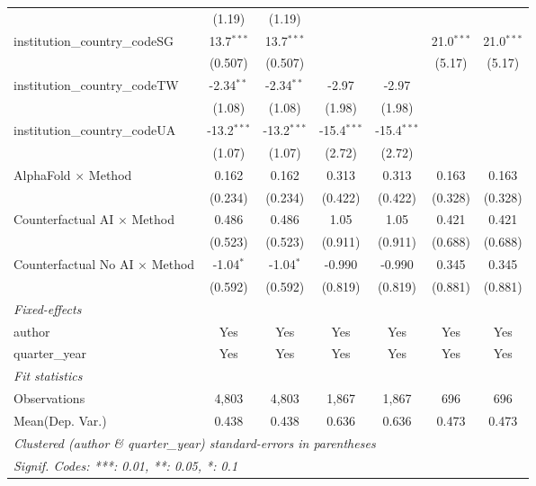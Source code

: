 \begin{tabular}{lcccccc}
                                         & (1.19)        & (1.19)        &               &               &               &   \\   
   institution\_country\_codeSG          & 13.7$^{***}$  & 13.7$^{***}$  &               &               & 21.0$^{***}$  & 21.0$^{***}$\\   
                                         & (0.507)       & (0.507)       &               &               & (5.17)        & (5.17)\\   
   institution\_country\_codeTW          & -2.34$^{**}$  & -2.34$^{**}$  & -2.97         & -2.97         &               &   \\   
                                         & (1.08)        & (1.08)        & (1.98)        & (1.98)        &               &   \\   
   institution\_country\_codeUA          & -13.2$^{***}$ & -13.2$^{***}$ & -15.4$^{***}$ & -15.4$^{***}$ &               &   \\   
                                         & (1.07)        & (1.07)        & (2.72)        & (2.72)        &               &   \\   
   AlphaFold $\times$ Method             & 0.162         & 0.162         & 0.313         & 0.313         & 0.163         & 0.163\\   
                                         & (0.234)       & (0.234)       & (0.422)       & (0.422)       & (0.328)       & (0.328)\\   
   Counterfactual AI $\times$ Method     & 0.486         & 0.486         & 1.05          & 1.05          & 0.421         & 0.421\\   
                                         & (0.523)       & (0.523)       & (0.911)       & (0.911)       & (0.688)       & (0.688)\\   
   Counterfactual No AI $\times$ Method  & -1.04$^{*}$   & -1.04$^{*}$   & -0.990        & -0.990        & 0.345         & 0.345\\   
                                         & (0.592)       & (0.592)       & (0.819)       & (0.819)       & (0.881)       & (0.881)\\   
   \midrule
   \emph{Fixed-effects}\\
   author                                & Yes           & Yes           & Yes           & Yes           & Yes           & Yes\\  
   quarter\_year                         & Yes           & Yes           & Yes           & Yes           & Yes           & Yes\\  
   \midrule
   \emph{Fit statistics}\\
   Observations                          & 4,803         & 4,803         & 1,867         & 1,867         & 696           & 696\\  
Mean(Dep. Var.) & 0.438 & 0.438 & 0.636 & 0.636 & 0.473 & 0.473 \\
   \midrule \midrule
   \multicolumn{7}{l}{\emph{Clustered (author \& quarter\_year) standard-errors in parentheses}}\\
   \multicolumn{7}{l}{\emph{Signif. Codes: ***: 0.01, **: 0.05, *: 0.1}}\\
\end{tabular}
\par\endgroup
